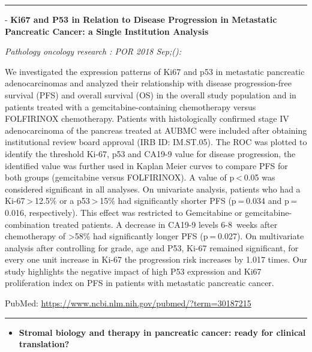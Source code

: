 \documentclass[]{article}
\providecommand{\tightlist}{%
  \setlength{\itemsep}{0pt}\setlength{\parskip}{0pt}}
\begin{document}
{}

\begin{center}\rule{0.5\linewidth}{\linethickness}\end{center}

 - \textbf{Ki67 and P53 in Relation to Disease Progression in Metastatic
Pancreatic Cancer: a Single Institution Analysis}

\emph{Pathology oncology research : POR 2018 Sep;():}

We investigated the expression patterns of Ki67 and p53 in metastatic
pancreatic adenocarcinomas and analyzed their relationship with disease
progression-free survival (PFS) and overall survival (OS) in the overall
study population and in patients treated with a gemcitabine-containing
chemotherapy versus FOLFIRINOX chemotherapy. Patients with
histologically confirmed stage IV adenocarcinoma of the pancreas treated
at AUBMC were included after obtaining institutional review board
approval (IRB ID: IM.ST.05). The ROC was plotted to identify the
threshold Ki-67, p53 and CA19-9 value for disease progression, the
identified value was further used in Kaplan Meier curves to compare PFS
for both groups (gemcitabine versus FOLFIRINOX). A value of
p \textless{} 0.05 was considered significant in all analyses. On
univariate analysis, patients who had a Ki-67 \textgreater{} 12.5\% or a
p53 \textgreater{} 15\% had significantly shorter PFS (p = 0.034 and
p = 0.016, respectively). This effect was restricted to Gemcitabine or
gemcitabine-combination treated patients. A decrease in CA19-9 levels
6-8~weeks after chemotherapy of \textgreater{}58\% had significantly
longer PFS (p = 0.027). On multivariate analysis after controlling for
grade, age and P53, Ki-67 remained significant, for every one unit
increase in Ki-67 the progression risk increases by 1.017 times. Our
study highlights the negative impact of high P53 expression and Ki67
proliferation index on PFS in patients with metastatic pancreatic
cancer.

PubMed: \url{https://www.ncbi.nlm.nih.gov/pubmed/?term=30187215}

{}

{}

\begin{center}\rule{0.5\linewidth}{\linethickness}\end{center}

\begin{itemize}
\tightlist
\item
  \textbf{Stromal biology and therapy in pancreatic cancer: ready for
  clinical translation?}
\end{itemize}
\end{document}
